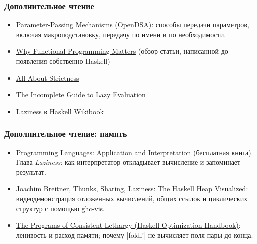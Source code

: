 \documentclass[11pt]{beamer}
\begin{document}
\begin{frame}[fragile]
  \frametitle{Дополнительное чтение}
  \begin{itemize}
    \item \href{https://opendsa-server.cs.vt.edu/ODSA/Books/uwosh/cs-331/spring-2020/PL_Book_Spr_2020/html/SLang2ParameterPassing.html}{Parameter-Passing Mechanisms (OpenDSA)}: способы передачи параметров, включая макроподстановку, передачу по имени и по необходимости.
    \item \href{https://blog.acolyer.org/2016/09/14/why-functional-programming-matters/}{Why Functional Programming Matters} (обзор статьи, написанной до появления собственно Haskell)
    \item \href{https://web.archive.org/web/20230322115320/https://www.fpcomplete.com/blog/2017/09/all-about-strictness/}{All About Strictness}
    \item \href{https://apfelmus.nfshost.com/articles/lazy-eval.html}{The Incomplete Guide to Lazy Evaluation}
    \item \href{https://en.wikibooks.org/wiki/Haskell/Laziness}{Laziness в Haskell Wikibook}
  \end{itemize}
\end{frame}


\begin{frame}[fragile]
  \frametitle{Дополнительное чтение: память}
  \begin{itemize}
    \item \href{https://www.plai.org/}{Programming Languages: Application and Interpretation} (бесплатная книга). Глава \emph{Laziness}: как интерпретатор откладывает вычисление и запоминает результат.
    \item \href{https://www.youtube.com/watch?v=I4lnCG18TaY}{Joachim Breitner, Thunks, Sharing, Laziness: The Haskell Heap Visualized}: видеодемонстрация отложенных вычислений, общих ссылок и циклических структур с помощью ghc-vis.
    \item \href{https://haskell.foundation/hs-opt-handbook.github.io/src/Preliminaries/what_makes_fast_hs.html}{The Programs of Consistent Lethargy (Haskell Optimization Handbook)}: ленивость и расход памяти; почему \haskinline|foldl'| не вычисляет поля пары до конца.
  \end{itemize}
\end{frame}
\end{document}
